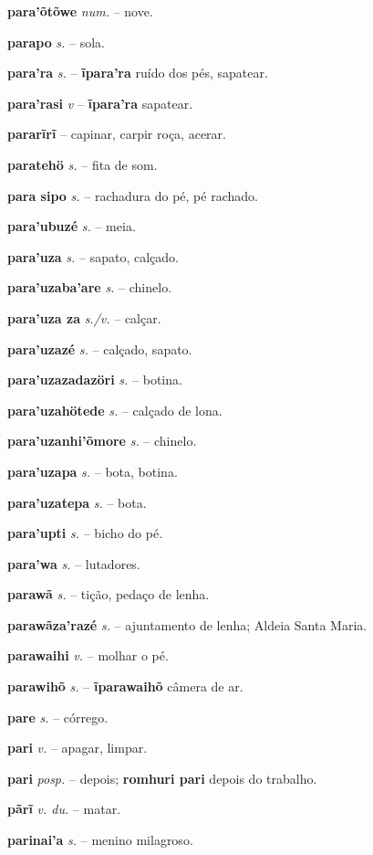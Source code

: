 \textbf{para'õtõwe} \textit{num.} -- nove.

\textbf{parapo} \textit{s.} -- sola.

\textbf{para'ra} \textit{s.} -- \textbf{ĩpara'ra} ruído dos pés, sapatear.

\textbf{para'rasi} \textit{v} -- \textbf{ĩpara'ra} sapatear.

\textbf{pararĩrĩ} -- capinar, carpir roça, acerar.

\textbf{paratehö} \textit{s.} -- fita de som.

\textbf{para sipo} \textit{s.} -- rachadura do pé, pé rachado.

\textbf{para'ubuzé} \textit{s.} -- meia.

\textbf{para'uza} \textit{s.} -- sapato, calçado.

\textbf{para'uzaba'are} \textit{s.} -- chinelo.

\textbf{para'uza za} \textit{s./v.} -- calçar.

\textbf{para'uzazé} \textit{s.} -- calçado, sapato.

\textbf{para'uzazadazöri} \textit{s.} -- botina.

\textbf{para'uzahötede} \textit{s.} -- calçado de lona.

\textbf{para'uzanhi'õmore} \textit{s.} -- chinelo.

\textbf{para'uzapa} \textit{s.} -- bota, botina.

\textbf{para'uzatepa} \textit{s.} -- bota.

\textbf{para'upti} \textit{s.} -- bicho do pé.

\textbf{para'wa} \textit{s.} -- lutadores.

\textbf{parawã} \textit{s.} -- tição, pedaço de lenha.

\textbf{parawãza'razé} \textit{s.} -- ajuntamento de lenha; Aldeia Santa Maria.

\textbf{parawaihi} \textit{v.} -- molhar o pé.

\textbf{parawihõ} \textit{s.} -- \textbf{ĩparawaihõ} câmera de ar.

\textbf{pare} \textit{s.} -- córrego.

\textbf{pari} \textit{v.} -- apagar, limpar.

\textbf{pari} \textit{posp.} -- depois; \textbf{romhuri pari} depois do trabalho.

\textbf{pãrĩ} \textit{v. du.} -- matar.

\textbf{parinai'a} \textit{s.} -- menino milagroso.

